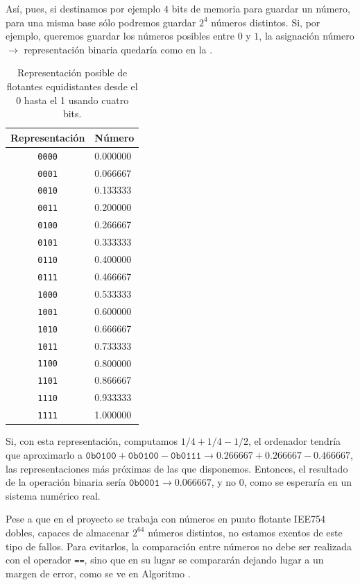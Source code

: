 Así, pues, si destinamos por ejemplo $4$ bits de memoria para guardar un número, para una misma base sólo podremos 
guardar $2^{4}$ números distintos. Si, por ejemplo, queremos guardar los números posibles entre $0$ y $1$, la 
asignación número $\rightarrow$ representación binaria quedaría como en la .

\begin{table}
\begin{tabular}{cl}
 Representación & Número \\\hline
  \texttt{0000} & 0.000000 \\
  \texttt{0001} & 0.066667 \\
  \texttt{0010} & 0.133333 \\
  \texttt{0011} & 0.200000 \\
  \texttt{0100} & 0.266667 \\
  \texttt{0101} & 0.333333 \\
  \texttt{0110} & 0.400000 \\
  \texttt{0111} & 0.466667 \\
  \texttt{1000} & 0.533333 \\
  \texttt{1001} & 0.600000 \\
  \texttt{1010} & 0.666667 \\
  \texttt{1011} & 0.733333 \\
  \texttt{1100} & 0.800000 \\
  \texttt{1101} & 0.866667 \\
  \texttt{1110} & 0.933333 \\
  \texttt{1111} & 1.000000
 \end{tabular}
 \caption{Representación posible de flotantes equidistantes desde el 0 hasta el 1 usando cuatro bits.}
\end{table}

Si, con esta representación, computamos $1/4+1/4-1/2$, el ordenador tendría que aproximarlo a 
$\mathtt{0b0100}+\mathtt{0b0100}-\mathtt{0b0111} \rightarrow 0.266667+0.266667-0.466667$, las representaciones más 
próximas de las que disponemos. Entonces, el resultado de la operación binaria sería $\mathtt{0b0001} \rightarrow 
0.066667$, y no $0$, como se esperaría en un sistema numérico real.

Pese a que en el proyecto se trabaja con números en punto flotante IEE754 dobles, capaces de almacenar $2^64$ números 
distintos, no estamos exentos de este tipo de fallos. Para evitarlos, la comparación entre números no debe ser 
realizada con el operador \texttt{==}, sino que en su lugar se compararán dejando lugar a un margen de error, como se 
ve en Algoritmo .

